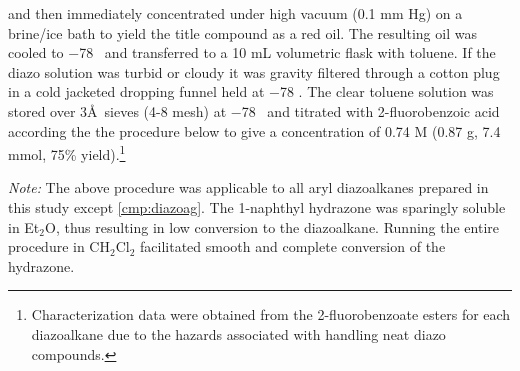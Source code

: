 and then immediately concentrated under high vacuum (0.1 mm Hg) on a brine/ice
bath to yield the title compound as a red oil. The resulting oil was cooled to
$-$78 \degc\ and transferred to a 10 mL volumetric flask with toluene. If the
diazo solution was turbid or cloudy it was gravity filtered through a cotton
plug in a cold jacketed dropping funnel held at $-$78 \degc. The clear toluene
solution was stored over 3\AA\ sieves (4-8 mesh) at $-$78 \degc\ and titrated
with 2-fluorobenzoic acid according the the procedure below to give a
concentration of 0.74 M (0.87 g, 7.4 mmol, 75\%
yield).\footnote{Characterization data were obtained from the 2-fluorobenzoate
esters for each diazoalkane due to the hazards associated with handling neat
diazo compounds.}

\noindent \textit{Note:} The above procedure was applicable to all
aryl diazoalkanes prepared in this study except \ref{cmp:diazoag}. The
1-naphthyl hydrazone was sparingly soluble in Et$_2$O, thus resulting in low conversion to the
diazoalkane. Running the entire procedure in CH$_2$Cl$_2$ facilitated smooth and
complete conversion of the hydrazone.

